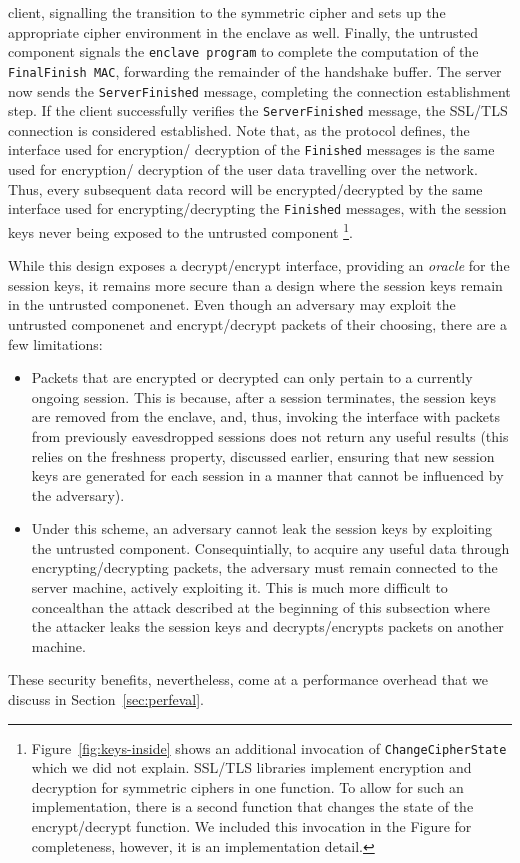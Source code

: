 \documentclass[../../main.tex]{subfiles}
\begin{document}
client, signalling the transition to the symmetric cipher and sets up
the appropriate cipher environment in the enclave as well. Finally,
the untrusted component signals the \texttt{enclave program} to
complete the computation of the \texttt{FinalFinish MAC}, forwarding
the remainder of the handshake buffer. The server now sends the
\texttt{ServerFinished} message, completing the connection
establishment step. If the client successfully verifies the
\texttt{ServerFinished} message, the SSL/TLS connection is considered
established. Note that, as the protocol defines, the interface used
for encryption/ decryption of the \texttt{Finished} messages is the
same used for encryption/ decryption of the user data travelling over
the network. Thus, every subsequent data record will be
encrypted/decrypted by the same interface used for
encrypting/decrypting the \texttt{Finished} messages, with the session
keys never being exposed to the untrusted component
\footnote{Figure~\ref{fig:keys-inside} shows an additional invocation
  of \texttt{Change\-Cipher\-State} which we did not explain. SSL/TLS
  libraries implement encryption and decryption for symmetric ciphers
  in one function. To allow for such an implementation, there is a
  second function that changes the state of the encrypt/decrypt
  function. We included this invocation in the Figure for
  completeness, however, it is an implementation detail.}.

While this design exposes a decrypt/encrypt interface, providing an
\textit{oracle} for the session keys, it remains more secure than a
design where the session keys remain in the untrusted componenet. Even
though an adversary may exploit the untrusted componenet and
encrypt/decrypt packets of their choosing, there are a few
limitations:
\begin{itemize}
  \item Packets that are encrypted or decrypted can only pertain to
    a currently ongoing session. This is because, after a session
    terminates, the session keys are removed from the enclave, and, thus,
    invoking the interface with packets from previously eavesdropped
    sessions does not return any useful results (this relies on the
    freshness property, discussed earlier, ensuring that new session keys
    are generated for each session in a manner that cannot be influenced
    by the adversary).
  \item Under this scheme, an adversary cannot leak the session keys
    by exploiting the untrusted component. Consequintially, to acquire
    any useful data through encrypting/decrypting packets, the adversary
    must remain connected to the server machine, actively exploiting it.
    This is much more difficult to concealthan the attack described
    at the beginning of this subsection where the attacker leaks the session
    keys and decrypts/encrypts packets on another machine.
\end{itemize}
These security benefits, nevertheless, come at a performance overhead that we discuss
in Section~\ref{sec:perfeval}.
\end{document}
